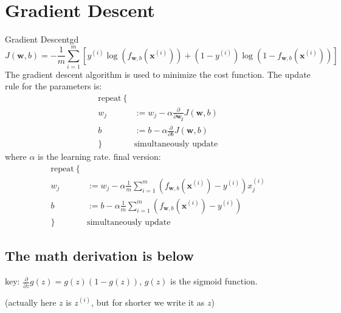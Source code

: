 \section{Gradient Descent}
\begin{thmbox}{Gradient Descent}{gd}
    \begin{equation}
        J(\mathbf{w}, b) = -\frac{1}{m} \sum_{i=1}^{m} \left[y^{(i)} \log\left(f_{\mathbf{w}, b}\left(\mathbf{x}^{(i)}\right)\right) + \left(1 - y^{(i)}\right) \log\left(1 - f_{\mathbf{w}, b}
        \left(\mathbf{x}^{(i)}\right)\right)\right]
    \end{equation}
    \hspace{2em}The gradient descent algorithm is used to minimize the cost function.
    The update rule for the parameters is:
    \begin{align*}
        \text{repeat}\ \{ &\\
        w_j &:= w_j - \alpha \frac{\partial}{\partial \mathbf{w_j}} J(\mathbf{w}, b)\\
        b &:= b - \alpha \frac{\partial}{\partial b} J(\mathbf{w}, b)\\
        \} \quad &\text{simultaneously update}
    \end{align*}
    where $\alpha$ is the learning rate.
    final version:
    \begin{align}
        \text{repeat}\ \{ &\nonumber\\
        w_j &:= w_j - \alpha \frac{1}{m} \sum_{i=1}^{m} \left(f_{\mathbf{w}, b}(\mathbf{x}^{(i)}) - y^{(i)}\right) x_j^{(i)}\\
        b &:= b - \alpha \frac{1}{m} \sum_{i=1}^{m} \left(f_{\mathbf{w}, b}(\mathbf{x}^{(i)}) - y^{(i)}\right)\\
        \} \quad &\text{simultaneously update} \nonumber
    \end{align}
\end{thmbox}

\subsection*{The math derivation is below}
key: $\frac{\partial}{\partial z} g(z) = g(z)(1 - g(z))$, $g(z)$ is the sigmoid function.

(actually here $z$ is $z^{(i)}$, but for shorter we write it as $z$)

